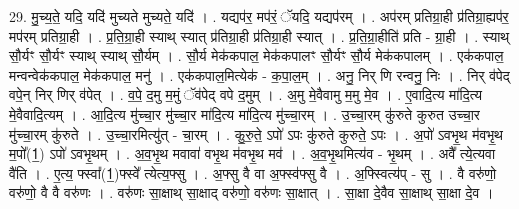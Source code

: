 \documentclass[17pt]{extarticle}
\begin{document}
29. मु॒च्य॒ते॒ यदि॒ यदि॑ मुच्यते मुच्यते॒ यदि॑ । . यद्यप॑र॒ मप॑रं॒ ॅयदि॒ यद्यप॑रम् । . अप॑रम् प्रतिग्रा॒ही प्र॑तिग्रा॒ह्यप॑र॒ मप॑रम् प्रतिग्रा॒ही । . प्र॒ति॒ग्रा॒ही स्याथ् स्यात् प्र॑तिग्रा॒ही प्र॑तिग्रा॒ही स्यात् । . प्र॒ति॒ग्रा॒हीति॑ प्रति - ग्रा॒ही । . स्याथ् सौ॒र्यꣳ सौ॒र्यꣳ स्याथ् स्याथ् सौ॒र्यम् । . सौ॒र्य मेक॑कपाल॒ मेक॑कपालꣳ सौ॒र्यꣳ सौ॒र्य मेक॑कपालम् । . एक॑कपाल॒ मन्वन्वेक॑कपाल॒ मेक॑कपाल॒ मनु॑ । . एक॑कपाल॒मित्येक॑ - क॒पा॒ल॒म् । . अनु॒ निर् णि रन्वनु॒ निः । . निर् व॑पेद् वपे॒न् निर् णिर् व॑पेत् । . व॒पे॒ द॒मु म॒मुं ॅव॑पेद् वपे द॒मुम् । . अ॒मु मे॒वैवामु म॒मु मे॒व । . ए॒वादि॒त्य मा॑दि॒त्य मे॒वैवादि॒त्यम् । . आ॒दि॒त्य मु॑च्चा॒र मु॑च्चा॒र मा॑दि॒त्य मा॑दि॒त्य मु॑च्चा॒रम् । . उ॒च्चा॒रम् कु॑रुते कुरुत उच्चा॒र मु॑च्चा॒रम् कु॑रुते । . उ॒च्चा॒रमित्यु॑त् - चा॒रम् । . कु॒रु॒ते॒ ऽपो॑ ऽपः कु॑रुते कुरुते॒ ऽपः । . अ॒पो॑ ऽवभृ॒थ म॑वभृ॒थ म॒पो᳚(1॒) ऽपो॑ ऽवभृ॒थम् । . अ॒व॒भृ॒थ मवावा॑ वभृ॒थ म॑वभृ॒थ मव॑ । . अ॒व॒भृ॒थमित्य॑व - भृ॒थम् । . अवै᳚ त्ये॒त्यवा वै॑ति । . ए॒त्य॒ फ्स्वा᳚(1॒)फ्स्वे᳚ त्येत्य॒फ्सु । . अ॒फ्सु वै वा अ॒फ्स्व॑फ्सु वै । . अ॒फ्स्वित्य॑प् - सु । . वै वरु॑णो॒ वरु॑णो॒ वै वै वरु॑णः । . वरु॑णः सा॒क्षाथ् सा॒क्षाद् वरु॑णो॒ वरु॑णः सा॒क्षात् । . सा॒क्षा दे॒वैव सा॒क्षाथ् सा॒क्षा दे॒व । \newline
\end{document}
